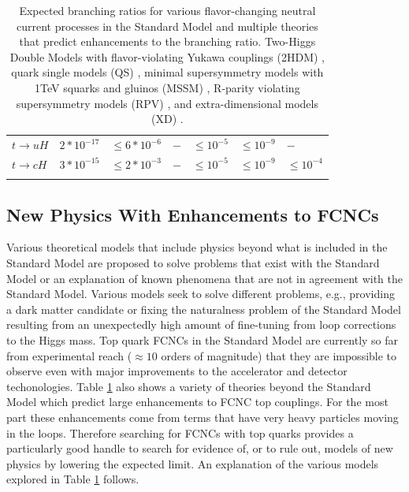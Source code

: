 \begin{table}[]
\begin{center}
\begin{tabular}{lllllll}
$t\rightarrow u H                    $ & $ 2*10^{-17} $  & $ \leq 6*10^{-6} $ & $ -                      $ & $ \leq 10^{-5} $ & $ \leq 10^{-9} $     & $ -    $                                           \\
$t\rightarrow c H                    $ & $ 3*10^{-15} $  & $ \leq 2*10^{-3} $ & $ -                      $ & $ \leq 10^{-5} $ & $ \leq 10^{-9} $     & $ \leq 10^{-4} $ \\
\hhline{=======}
\end{tabular}
	\caption[Expected branching ratios for various flavor-changing neutral current processes in the Standard Model and multiple theories that predict enhancements to the branching ratio.  Two-Higgs Double Models with flavor-violating Yukawa couplings (2HDM), quark single models (QS), minimal supersymmetry models with 1TeV squarks and gluinos (MSSM), R-parity violating supersymmetry models (RPV), and extra-dimensional models (XD).]{Expected branching ratios for various flavor-changing neutral current processes in the Standard Model\cite{2HDM-2} and multiple theories that predict enhancements to the branching ratio.  Two-Higgs Double Models with flavor-violating Yukawa couplings (2HDM) \cite{2HDM-2,2HDM-3}, quark single models (QS) \cite{QS-1,QS-2}, minimal supersymmetry models with 1TeV squarks and gluinos (MSSM) \cite{MSSM}, R-parity violating supersymmetry models (RPV) \cite{RPVSusyFCNC}, and extra-dimensional models (XD) \cite{XDFCNC}.}
	\label{tab:FCNCLimits}
\end{center}
\end{table}

\subsection{New Physics With Enhancements to FCNCs}
\label{sec:bsmFCNC}
Various theoretical models that include physics beyond what is included in the Standard Model are proposed to solve problems that exist with the Standard Model or an explanation of known phenomena that are not in agreement with the Standard Model.  Various models seek to solve different problems, e.g., providing a dark matter candidate or fixing the naturalness problem of the Standard Model resulting from an unexpectedly high amount of fine-tuning from loop corrections to the Higgs mass.  
Top quark FCNCs in the Standard Model are currently so far from experimental reach ($\approx 10$ orders of magnitude) that they are impossible to observe even with major improvements to the accelerator and detector techonologies.  Table \ref{tab:FCNCLimits} also shows a variety of theories beyond the Standard Model which predict large enhancements to FCNC top couplings.  For the most part these enhancements come from terms that have very heavy particles moving in the loops.  Therefore searching for FCNCs with top quarks provides a particularly good handle to search for evidence of, or to rule out, models of new physics by lowering the expected limit.  An explanation of the various models explored in Table \ref{tab:FCNCLimits} follows.

